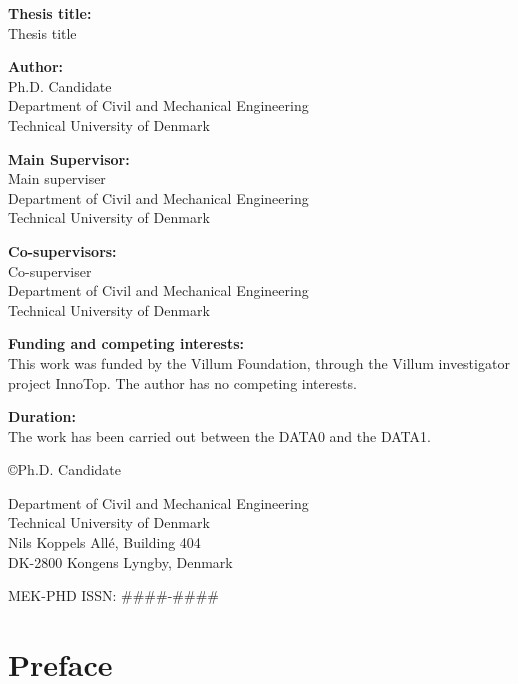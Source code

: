 \begin{titlingpage}
  \titleM
  \clearpage
  \noindent\textbf{Thesis title:} \\\noindent Thesis title
  \vspace{1.5em}

  \noindent\textbf{Author:}\\\noindent Ph.D. Candidate\\Department of Civil and Mechanical Engineering\\ Technical University of Denmark
  \vspace{0.5em}

  \noindent\textbf{Main Supervisor:}\\\noindent Main superviser\\Department of Civil and Mechanical Engineering\\ Technical University of Denmark
  \vspace{0.5em}

  \noindent\textbf{Co-supervisors:}\\
  \noindent Co-superviser\\Department of Civil and Mechanical Engineering\\ Technical University of Denmark
  \vspace{0.5em}

  \noindent\textbf{Funding and competing interests:}\\\noindent This work was funded by the Villum Foundation, through the Villum investigator project InnoTop. The author has no competing interests.
  \vspace{1.5em}

  \noindent\textbf{Duration:}\\\noindent The work has been carried out between the DATA0 and the DATA1.
  \vspace{2.2em}

  \noindent \copyright Ph.D. Candidate
  \vspace{1em}

  \noindent Department of Civil and Mechanical Engineering\\Technical University of Denmark\\ Nils Koppels Allé, Building 404 \\ DK-2800 Kongens Lyngby, Denmark
  \vspace{1em}

  \noindent MEK-PHD ISSN: \#\#\#\#-\#\#\#\#
\end{titlingpage}
\setcounter{page}{3}
\chapter*{Preface}

